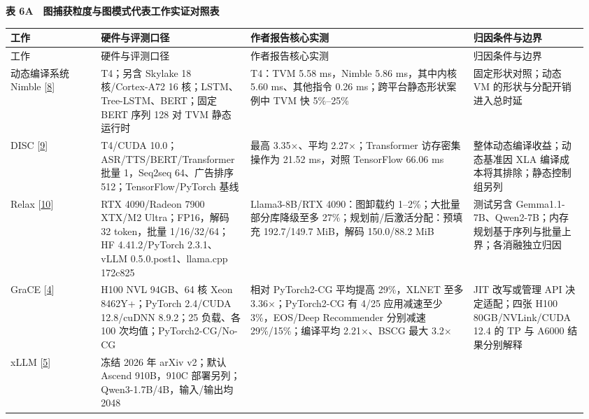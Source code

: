 \documentclass[UTF8,10.5pt,fontset=windows]{ctexart}
\newcommand{\TableTitle}[1]{\par\Needspace{5\baselineskip}\begingroup\centering\bfseries\fontsize{9.5}{13}\selectfont #1\par\endgroup\nobreak}
\begin{document}
\begin{landscape}
\begingroup
\fontsize{8.6}{11.8}\selectfont
\setlength{\tabcolsep}{2.5pt}
\setlength{\emergencystretch}{0.5\linewidth}
\renewcommand{\arraystretch}{1.10}
\TableTitle{\textbf{表 6A　图捕获粒度与图模式代表工作实证对照表}}
\begin{longtable}[c]{@{}>{\raggedright\arraybackslash}p{0.1536\linewidth}
>{\raggedright\arraybackslash}p{0.2400\linewidth}
>{\raggedright\arraybackslash}p{0.3744\linewidth}
>{\raggedright\arraybackslash}p{0.1920\linewidth}@{}}
\toprule
工作 & 硬件与评测口径 & 作者报告核心实测 & 归因条件与边界 \\
\midrule\endfirsthead
\toprule
工作 & 硬件与评测口径 & 作者报告核心实测 & 归因条件与边界 \\
\midrule\endhead
\bottomrule\endfoot
\bottomrule\endlastfoot
动态编译系统 Nimble {[}\protect\hyperlink{ref-shen2021nimble}{8}{]} &
T4；另含 Skylake 18 核/Cortex-A72 16 核；LSTM、Tree-LSTM、BERT；固定
BERT 序列 128 对 TVM 静态运行时 & T4：TVM 5.58 ms，Nimble 5.86
ms，其中内核 5.60 ms、其他指令 0.26 ms；跨平台静态形状案例中 TVM 快
5\%--25\% & 固定形状对照；动态 VM 的形状与分配开销进入总时延 \\
DISC {[}\protect\hyperlink{ref-zhu2021disc}{9}{]} & T4/CUDA
10.0；ASR/TTS/BERT/Transformer 批量 1，Seq2seq 64、广告排序
512；TensorFlow/PyTorch 基线 & 最高 3.35\(\times\)、平均 2.27\(\times\)；Transformer
访存密集操作为 21.52 ms，对照 TensorFlow 66.06 ms &
整体动态编译收益；动态基准因 XLA 编译成本将其排除；静态控制组另列 \\
Relax {[}\protect\hyperlink{ref-lai2025relax}{10}{]} & RTX 4090/Radeon
7900 XTX/M2 Ultra；FP16，解码 32 token，批量 1/16/32/64；HF
4.41.2/PyTorch 2.3.1、vLLM 0.5.0.post1、llama.cpp 172c825 &
Llama3-8B/RTX 4090：图卸载约 1--2\%；大批量部分库降级至多
27\%；规划前/后激活分配：预填充 192.7/149.7 MiB，解码 150.0/88.2 MiB &
测试另含
Gemma1.1-7B、Qwen2-7B；内存规划基于序列与批量上界；各消融独立归因 \\
GraCE {[}\protect\hyperlink{ref-ghosh2026grace}{4}{]} & H100 NVL
94GB、64 核 Xeon 8462Y+；PyTorch 2.4/CUDA 12.8/cuDNN 8.9.2；25 负载、各
100 次均值；PyTorch2-CG/No-CG & 相对 PyTorch2-CG 平均提高 29\%，XLNET
至多 3.36\(\times\)；PyTorch2-CG 有 4/25 应用减速至少 3\%，EOS/Deep Recommender
分别减速 29\%/15\%；编译平均 2.21\(\times\)、BSCG 最大 3.2\(\times\) & JIT 改写或管理 API
决定适配；四张 H100 80GB/NVLink/CUDA 12.4 的 TP 与 A6000 结果分别解释 \\
xLLM {[}\protect\hyperlink{ref-liu2025xllm}{5}{]} & 冻结 2026 年 arXiv
v2；默认 Ascend 910B，910C 部署另列；Qwen3-1.7B/4B，输入/输出均 2048

\end{longtable}
\end{landscape}
\end{document}
